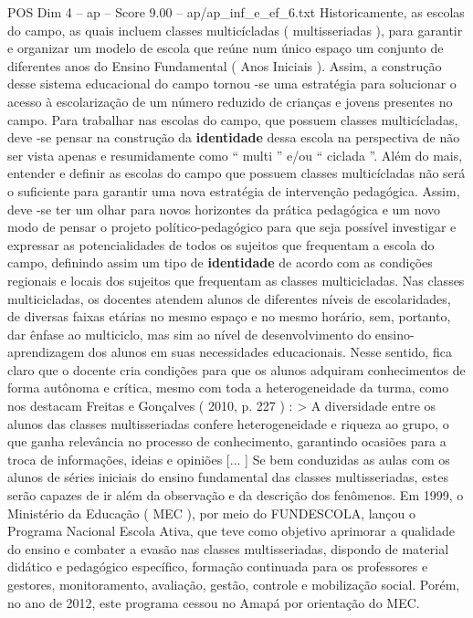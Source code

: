 \begin{textsample}{POS Dim 4 – ap – Score 9.00 – ap/ap\_inf\_e\_ef\_6.txt}
Historicamente, as escolas do campo, as quais incluem classes multicícladas ( multisseriadas ), para garantir e organizar um modelo de escola que reúne num único espaço um conjunto de diferentes anos do Ensino Fundamental ( Anos Iniciais ).
Assim, a construção desse sistema educacional do campo tornou -se uma estratégia para solucionar o acesso à escolarização de um número reduzido de crianças e jovens presentes no campo.
Para trabalhar nas escolas do campo, que possuem classes multicícladas, deve -se pensar na construção da \textbf{identidade} dessa escola na perspectiva de não ser vista apenas e resumidamente como “ multi ” e/ou “ ciclada ”.
Além do mais, entender e definir as escolas do campo que possuem classes multicícladas não será o suficiente para garantir uma nova estratégia de intervenção pedagógica.
Assim, deve -se ter um olhar para novos horizontes da prática pedagógica e um novo modo de pensar o projeto político-pedagógico para que seja possível investigar e expressar as potencialidades de todos os sujeitos que frequentam a escola do campo, definindo assim um tipo de \textbf{identidade} de acordo com as condições regionais e locais dos sujeitos que frequentam as classes multicicladas.
Nas classes multicicladas, os docentes atendem alunos de diferentes níveis de escolaridades, de diversas faixas etárias no mesmo espaço e no mesmo horário, sem, portanto, dar ênfase ao multiciclo, mas sim ao nível de desenvolvimento do ensino-aprendizagem dos alunos em suas necessidades educacionais.
Nesse sentido, fica claro que o docente cria condições para que os alunos adquiram conhecimentos de forma autônoma e crítica, mesmo com toda a heterogeneidade da turma, como nos destacam Freitas e Gonçalves ( 2010, p. 227 ) : > A diversidade entre os alunos das classes multisseriadas confere heterogeneidade e riqueza ao grupo, o que ganha relevância no processo de conhecimento, garantindo ocasiões para a troca de informações, ideias e opiniões [... ] Se bem conduzidas as aulas com os alunos de séries iniciais do ensino fundamental das classes multisseriadas, estes serão capazes de ir além da observação e da descrição dos fenômenos.
Em 1999, o Ministério da Educação ( MEC ), por meio do FUNDESCOLA, lançou o Programa Nacional Escola Ativa, que teve como objetivo aprimorar a qualidade do ensino e combater a evasão nas classes multisseriadas, dispondo de material didático e pedagógico específico, formação continuada para os professores e gestores, monitoramento, avaliação, gestão, controle e mobilização social.
Porém, no ano de 2012, este programa cessou no Amapá por orientação do MEC.

\end{textsample}
